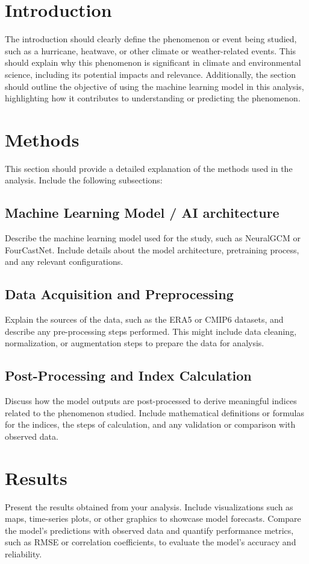 \section{Introduction}
The introduction should clearly define the phenomenon or event being studied, such as a hurricane, heatwave, or other climate or weather-related events. This should explain why this phenomenon is significant in climate and environmental science, including its potential impacts and relevance. Additionally, the section should outline the objective of using the machine learning model in this analysis, highlighting how it contributes to understanding or predicting the phenomenon.

\newpage

\section{Methods}
This section should provide a detailed explanation of the methods used in the analysis. Include the following subsections:

\subsection{Machine Learning Model / AI architecture}
Describe the machine learning model used for the study, such as NeuralGCM or FourCastNet. Include details about the model architecture, pretraining process, and any relevant configurations.

\subsection{Data Acquisition and Preprocessing}
Explain the sources of the data, such as the ERA5 or CMIP6 datasets, and describe any pre-processing steps performed. This might include data cleaning, normalization, or augmentation steps to prepare the data for analysis.

\subsection{Post-Processing and Index Calculation}
Discuss how the model outputs are post-processed to derive meaningful indices related to the phenomenon studied. Include mathematical definitions or formulas for the indices, the steps of calculation, and any validation or comparison with observed data.

\newpage

\section{Results}
Present the results obtained from your analysis. Include visualizations such as maps, time-series plots, or other graphics to showcase model forecasts. Compare the model's predictions with observed data and quantify performance metrics, such as RMSE or correlation coefficients, to evaluate the model's accuracy and reliability.

